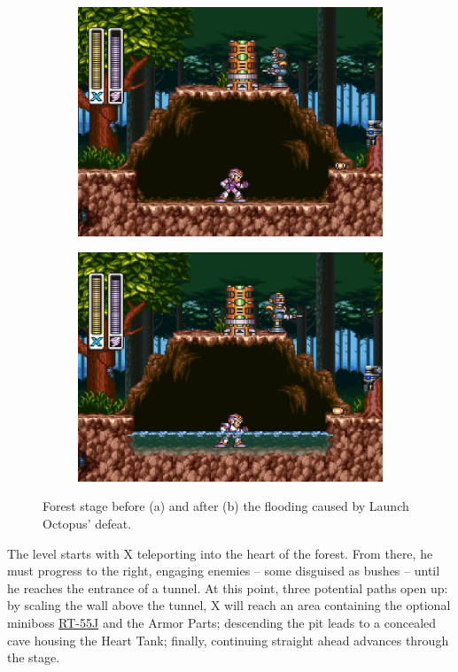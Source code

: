 \begin{figure}[htp]
	\centering
	\begin{subfigure}{0.4\linewidth}
		\centering
		\includegraphics[width=\linewidth]{figures/X1/Sting_chameleon/Sting_no_water.jpg}
		\caption{}
	\end{subfigure}
	\begin{subfigure}{0.4\linewidth}
		\centering
		\includegraphics[width=\linewidth]{figures/X1/Sting_chameleon/Sting_water.jpg}
		\caption{}
	\end{subfigure}
	\caption{Forest stage before (a) and after (b) the flooding caused by Launch Octopus' defeat.}
\end{figure}
The level starts with X teleporting into the heart of the forest. From there, he must progress to the right, engaging enemies – some disguised as bushes – until he reaches the entrance of a tunnel. At this point, three potential paths open up: by scaling the wall above the tunnel, X will reach an area containing the optional miniboss \hyperlink{miniboss:RT-55J}{RT-55J} and the Armor Parts; descending the pit leads to a concealed cave housing the Heart Tank; finally, continuing straight ahead advances through the stage.
